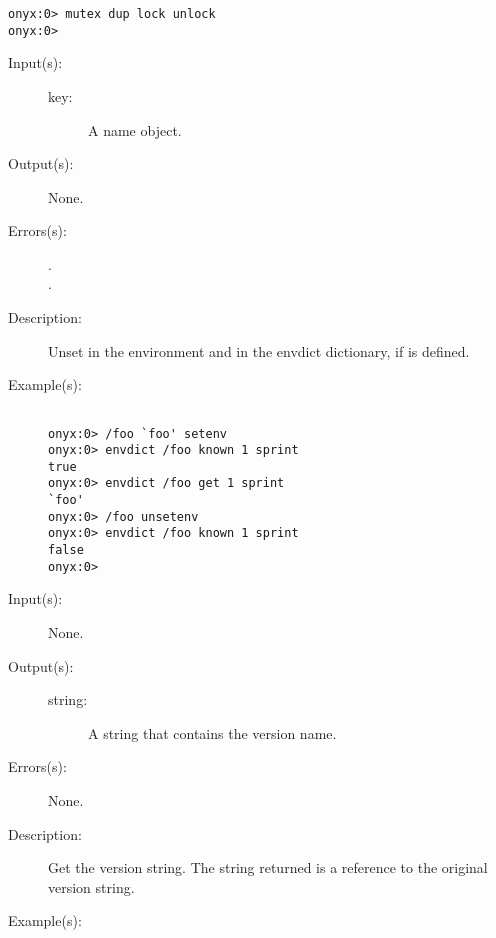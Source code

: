\begin{description}
\begin{description}
\begin{verbatim}
onyx:0> mutex dup lock unlock
onyx:0>
		\end{verbatim}
	\end{description}
\label{systemdict:unsetenv}
\item[{\onyxop{key}{unsetenv}{--}}: ]
	\begin{description}\item[]
	\item[Input(s): ]
		\begin{description}\item[]
		\item[key: ]
			A name object.
		\end{description}
	\item[Output(s): ] None.
	\item[Errors(s): ]
		\begin{description}\item[]
		\item[.]
		\item[.]
		\end{description}
	\item[Description: ]
		Unset  in the environment and in the envdict
		dictionary, if  is defined.
	\item[Example(s): ]\begin{verbatim}

onyx:0> /foo `foo' setenv
onyx:0> envdict /foo known 1 sprint
true
onyx:0> envdict /foo get 1 sprint
`foo'
onyx:0> /foo unsetenv
onyx:0> envdict /foo known 1 sprint
false
onyx:0>
		\end{verbatim}
	\end{description}
\label{systemdict:version}
\item[{\onyxop{--}{version}{string}}: ]
	\begin{description}\item[]
	\item[Input(s): ] None.
	\item[Output(s): ]
		\begin{description}\item[]
		\item[string: ]
			A string that contains the version name.
		\end{description}
	\item[Errors(s): ] None.
	\item[Description: ]
		Get the version string.  The string returned is a reference to
		the original version string.
	\item[Example(s): ]\begin{verbatim}


\end{verbatim}
\end{description}
\end{description}
